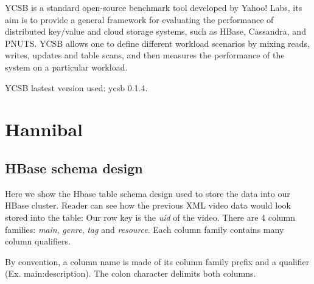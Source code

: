 YCSB\cite{cooper2010benchmarking} is a standard open-source benchmark tool developed by Yahoo! Labs, its aim is to provide a general framework for evaluating the performance of distributed key/value and cloud storage systems, such as HBase, Cassandra, and PNUTS. YCSB allows one to define different workload scenarios by mixing reads, writes, updates and table scans, and then measures the performance of the system on a particular workload.
\par
{}
\par
YCSB lastest version \cite{YCSB} used: ycsb 0.1.4.

\section{Hannibal}





\subsection{HBase schema design}

Here we show the Hbase table schema design used to store the data into our HBase cluster. Reader can see how the previous XML video data would look stored into the table: Our row key is the \textit{uid} of the video. There are 4 column families: \textit{main}, \textit{genre}, \textit{tag} and \textit{resource}. Each column family contains many column qualifiers.
\par
By convention, a column name is made of its column family prefix and a qualifier (Ex. main:description). The colon character delimits both columns.


